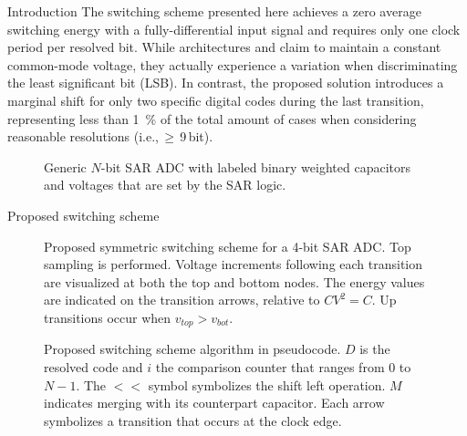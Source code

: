 \documentclass[final]{beamer}
\newlength{\colwidth}
\begin{document}
\begin{frame}[t]
\begin{columns}[t]
\begin{column}{\colwidth}
\begin{block}{Introduction}
    The switching scheme presented here achieves a zero average switching energy with a fully-differential input signal and requires only one clock period per resolved bit. While architectures \cite{Zhu10,Rahimi14,Xin21} and \cite{Wu17,Li20,Hu22}  claim to maintain a constant common-mode voltage, they actually experience a variation when discriminating the least significant bit (LSB). In contrast, the proposed solution introduces a marginal shift for only two specific digital codes during the last transition, representing less than \SI{1}{\percent} of the total amount of cases when considering reasonable resolutions (i.e.,\,$\geq$\,9\,bit).
    
    \begin{figure}[t] \centering
    	
    	\caption{Generic $N$-bit SAR ADC with labeled binary weighted capacitors and voltages that are set by the SAR logic.}
        \label{fig:labels}
    \end{figure}

  \end{block}


  \begin{block}{Proposed switching scheme}

      \begin{figure} \centering
              \centering
      	    
          	\caption{Proposed symmetric switching scheme for a 4-bit SAR ADC. Top sampling is performed. Voltage increments following each transition are visualized at both the top and bottom nodes. The energy values are indicated on the transition arrows, relative to $C V^2 = C$. Up transitions occur when $v_{top} > v_{bot}$.}
              \label{fig:scheme}
      \end{figure}


      \begin{figure} \centering
              \centering
      	    
              \caption{Proposed switching scheme algorithm in pseudocode. $D$ is the resolved code and $i$ the comparison counter that ranges from $0$ to $N-1$. The $<<$ symbol symbolizes the shift left operation. $M$ indicates merging with its counterpart capacitor. Each arrow symbolizes a transition that occurs at the clock edge.}
              \label{fig:algo}
      \end{figure}

  \end{block}

  

\end{column}


\end{columns}
\end{frame}
\end{document}
